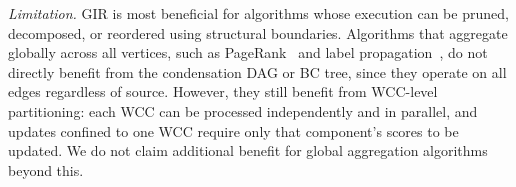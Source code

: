 \textit{Limitation.}
GIR is most beneficial for algorithms whose execution can be pruned, decomposed, or reordered using structural boundaries.
Algorithms that aggregate globally across all vertices, such
as PageRank~\cite{brin1998anatomy} and label propagation~\cite{zhu2003semi}, do not directly benefit from the
condensation DAG or BC tree, since they operate on all edges regardless of source.
However, they still benefit from WCC-level partitioning: each WCC can be processed independently and in parallel, and updates confined to one WCC require only that component's scores to be updated.
We do not claim additional benefit for global aggregation algorithms beyond this.


